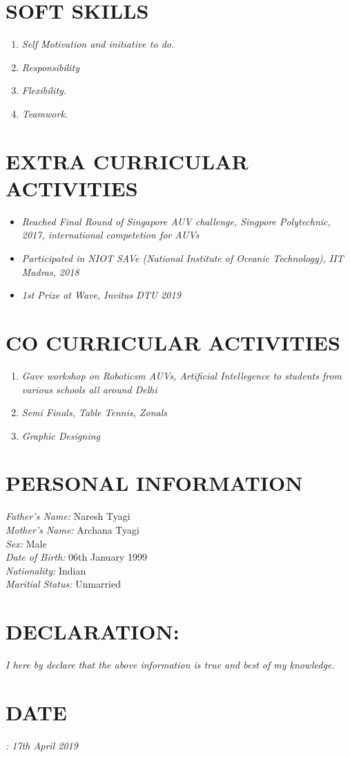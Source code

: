 \documentclass[margin]{res}
\begin{document}
\begin{resume}
\section{SOFT SKILLS }\begin{enumerate}
\item{\sl Self Motivation and initiative to do.}
\item{\sl Responsibility}
\item{\sl Flexibility.}
\item{\sl Teamwork.}
\end{enumerate}

\section{EXTRA CURRICULAR ACTIVITIES}\begin{itemize}
\item{\sl Reached Final Round of Singapore AUV challenge, Singpore Polytechnic, 2017, international competetion for AUVs}
\item{\sl Participated in NIOT SAVe (National Institute of Oceanic Technology), IIT Madras, 2018}
\item{\sl  1st Prize at Wave, Invitus DTU 2019}
\end{itemize}

\section{CO CURRICULAR ACTIVITIES}\begin{enumerate}
\item{\sl Gave workshop on Roboticsm AUVs, Artificial Intellegence to students from various schools all around Delhi}
\item{\sl Semi Finals, Table Tennis, Zonals}
\item{\sl Graphic Designing}
\end{enumerate}


\section{PERSONAL INFORMATION}
{\sl Father's Name:} Naresh Tyagi\\
{\sl Mother's Name:} Archana Tyagi\\
{\sl Sex:} Male\\
{\sl Date of Birth:} 06th January 1999\\
{\sl Nationality:} Indian\\
{\sl Maritial Status:} Unmarried\\

\section{DECLARATION: } 
{\sl I here by declare that the above information is true and best of my knowledge.}

 \section{DATE}
 {\sl : 17th April 2019}

\end{resume}
\end{document}
